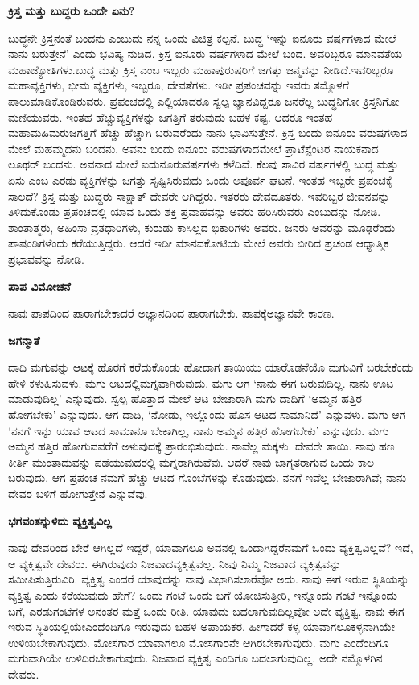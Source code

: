 \centerline{\textbf{ಕ್ರಿಸ್ತ ಮತ್ತು ಬುದ್ಧರು ಒಂದೇ ಏನು?}}

ಬುದ್ಧನೇ ಕ್ರಿಸ್ತನಂತೆ ಬಂದನು ಎಂಬುದು ನನ್ನ ಒಂದು ವಿಚಿತ್ರ ಕಲ್ಪನೆ. ಬುದ್ಧ ‘ಇನ್ನು ಐನೂರು ವರ್ಷಗಳಾದ ಮೇಲೆ ನಾನು ಬರುತ್ತೇನೆ’ ಎಂದು ಭವಿಷ್ಯ ನುಡಿದ. ಕ್ರಿಸ್ತ ಐನೂರು ವರ್ಷಗಳಾದ ಮೇಲೆ ಬಂದ. ಅವರಿಬ್ಬರೂ ಮಾನವತೆಯ ಮಹಾಜ್ಯೋತಿಗಳು.\break ಬುದ್ಧ ಮತ್ತು ಕ್ರಿಸ್ತ ಎಂಬ ಇಬ್ಬರು ಮಹಾಪುರುಷರಿಗೆ ಜಗತ್ತು ಜನ್ಮವನ್ನು ನೀಡಿದೆ.\break ಇವರಿಬ್ಬರೂ ಮಹಾವ್ಯಕ್ತಿಗಳು, ಭೀಮ ವ್ಯಕ್ತಿಗಳು, ಇಬ್ಬರೂ, ದೇವತೆಗಳು. ಇಡೀ ಪ್ರಪಂಚವನ್ನು ಇವರು ತಮ್ಮೊಳಗೆ ಪಾಲುಮಾಡಿಕೊಂಡಿರುವರು. ಪ್ರಪಂಚದಲ್ಲಿ ಎಲ್ಲಿಯಾದರೂ ಸ್ವಲ್ಪ ಜ್ಞಾನವಿದ್ದರೂ ಜನರೆಲ್ಲ ಬುದ್ಧನಿಗೋ ಕ್ರಿಸ್ತನಿಗೋ ಮಣಿಯುವರು. ಇಂತಹ ಹೆಚ್ಚು\break ವ್ಯಕ್ತಿಗಳನ್ನು ಜಗತ್ತಿಗೆ ತರುವುದು ಬಹಳ ಕಷ್ಟ. ಆದರೂ ಇಂತಹ ಮಹಾಮಹಿಮರು\break ಜಗತ್ತಿಗೆ ಹೆಚ್ಚು ಹೆಚ್ಚಾಗಿ ಬರುವರೆಂದು ನಾನು ಭಾವಿಸುತ್ತೇನೆ. ಕ್ರಿಸ್ತ ಬಂದು ಐನೂರು ವರುಷಗಳಾದ ಮೇಲೆ ಮಹಮ್ಮದನು ಬಂದನು. ಅವನು ಬಂದು ಐನೂರು ವರುಷಗಳಾದ\break ಮೇಲೆ ಪ್ರಾಟೆಸ್ಟೆಂಟರ ನಾಯಕನಾದ ಲೂಥರ್​ ಬಂದನು. ಅವನಾದ ಮೇಲೆ ಐದುನೂರು\break ವರ್ಷಗಳು ಕಳೆದಿವೆ. ಕೆಲವು ಸಾವಿರ ವರ್ಷಗಳಲ್ಲಿ ಬುದ್ಧ ಮತ್ತು ಏಸು ಎಂಬ ಎರಡು ವ್ಯಕ್ತಿಗಳನ್ನು ಜಗತ್ತು ಸೃಷ್ಟಿಸಿರುವುದು ಒಂದು ಅಪೂರ್ವ ಘಟನೆ. ಇಂತಹ ಇಬ್ಬರೇ ಪ್ರಪಂಚಕ್ಕೆ ಸಾಲದೆ? ಕ್ರಿಸ್ತ ಮತ್ತು ಬುದ್ಧರು ಸಾಕ್ಷಾತ್​ ದೇವರೇ ಆಗಿದ್ದರು. ಇತರರು ದೇವದೂತರು. ಇವರಿಬ್ಬರ ಜೀವನವನ್ನು ತಿಳಿದುಕೊಂಡು ಪ್ರಪಂಚದಲ್ಲಿ ಯಾವ ಒಂದು ಶಕ್ತಿ ಪ್ರವಾಹವನ್ನು ಅವರು ಹರಿಸಿರುವರು ಎಂಬುದನ್ನು ನೋಡಿ. ಶಾಂತಾತ್ಮರು, ಅಹಿಂಸಾ ವ್ರತಧಾರಿಗಳು, ಕುರುಡು ಕಾಸಿಲ್ಲದ ಭಿಕಾರಿಗಳು ಅವರು. ಜನರು ಅವರನ್ನು ಮೂಢರೆಂದು ಪಾಷಂಡಿಗಳೆಂದು ಕರೆಯುತ್ತಿದ್ದರು. ಆದರೆ ಇಡೀ ಮಾನವಕೋಟಿಯ ಮೇಲೆ ಅವರು ಬೀರಿದ ಪ್ರಚಂಡ ಆಧ್ಯಾತ್ಮಿಕ ಪ್ರಭಾವವನ್ನು ನೋಡಿ.

\centerline{\textbf{ಪಾಪ ವಿಮೋಚನೆ}}

ನಾವು ಪಾಪದಿಂದ ಪಾರಾಗಬೇಕಾದರೆ ಅಜ್ಞಾನದಿಂದ ಪಾರಾಗಬೇಕು. ಪಾಪಕ್ಕೆ\break ಅಜ್ಞಾನವೇ ಕಾರಣ.

\centerline{\textbf{ಜಗನ್ಮಾತೆ}}

ದಾದಿ ಮಗುವನ್ನು ಆಟಕ್ಕೆ ಹೊರಗೆ ಕರೆದುಕೊಂಡು ಹೋದಾಗ ತಾಯಿಯು ಯಾರೊಡನೆಯೊ ಮಗುವಿಗೆ ಬರಬೇಕೆಂದು ಹೇಳಿ ಕಳುಹಿಸುವಳು. ಮಗು ಆಟದಲ್ಲಿ\break ಮಗ್ನವಾಗಿರುವುದು. ಮಗು ಆಗ ‘ನಾನು ಈಗ ಬರುವುದಿಲ್ಲ. ನಾನು ಊಟ ಮಾಡುವುದಿಲ್ಲ’ ಎನ್ನುವುದು. ಸ್ವಲ್ಪ ಹೊತ್ತಾದ ಮೇಲೆ ಆಟ ಬೇಜಾರಾಗಿ ಮಗು ದಾದಿಗೆ ‘ಅಮ್ಮನ ಹತ್ತಿರ ಹೋಗಬೇಕು’ ಎನ್ನುವುದು. ಆಗ ದಾದಿ, ‘ನೋಡು, ಇಲ್ಲೊಂದು ಹೊಸ ಆಟದ ಸಾಮಾನಿದೆ’ ಎನ್ನುವಳು. ಮಗು ಆಗ ‘ನನಗೆ ಇನ್ನು ಯಾವ ಆಟದ ಸಾಮಾನೂ ಬೇಕಾಗಿಲ್ಲ, ನಾನು ಅಮ್ಮನ ಹತ್ತಿರ ಹೋಗಬೇಕು’ ಎನ್ನುವುದು. ಮಗು ಅಮ್ಮನ ಹತ್ತಿರ ಹೋಗುವವರೆಗೆ ಅಳುವುದಕ್ಕೆ ಪ್ರಾರಂಭಿಸುವುದು. ನಾವೆಲ್ಲ ಮಕ್ಕಳು. ದೇವರೇ ತಾಯಿ. ನಾವು ಹಣ ಕೀರ್ತಿ ಮುಂತಾದುವನ್ನು ಪಡೆಯುವುದರಲ್ಲಿ ಮಗ್ನರಾಗಿರುವೆವು. ಆದರೆ ನಾವು ಜಾಗೃತರಾಗುವ ಒಂದು ಕಾಲ ಬರುವುದು. ಆಗ ಪ್ರಪಂಚ ನಮಗೆ ಹೆಚ್ಚು ಆಟದ ಗೊಂಬೆಗಳನ್ನು ಕೊಡುವುದು. ನನಗೆ ಇವೆಲ್ಲ ಬೇಜಾರಾಗಿವೆ; ನಾನು ದೇವರ ಬಳಿಗೆ ಹೋಗುತ್ತೇನೆ ಎನ್ನುವೆವು.

\centerline{\textbf{ಭಗವಂತನ್ನುಳಿದು ವ್ಯಕ್ತಿತ್ವವಿಲ್ಲ}}

ನಾವು ದೇವರಿಂದ ಬೇರೆ ಆಗಿಲ್ಲದೆ ಇದ್ದರೆ, ಯಾವಾಗಲೂ ಅವನಲ್ಲಿ ಒಂದಾಗಿದ್ದರೆ\break ನಮಗೆ ಒಂದು ವ್ಯಕ್ತಿತ್ವವಿಲ್ಲವೆ? ಇದೆ, ಆ ವ್ಯಕ್ತಿತ್ವವೇ ದೇವರು. ಈಗಿರುವುದು ನಿಜವಾದ\break ವ್ಯಕ್ತಿತ್ವವಲ್ಲ. ನೀವು ನಿಮ್ಮ ನಿಜವಾದ ವ್ಯಕ್ತಿತ್ವವನ್ನು ಸಮೀಪಿಸುತ್ತಿರುವಿರಿ. ವ್ಯಕ್ತಿತ್ವ ಎಂದರೆ ಯಾವುದನ್ನು ನಾವು ವಿಭಾಗಿಸಲಾರೆವೋ ಅದು. ನಾವು ಈಗ ಇರುವ ಸ್ಥಿತಿಯನ್ನು ವ್ಯಕ್ತಿತ್ವ ಎಂದು ಕರೆಯುವುದು ಹೇಗೆ? ಒಂದು ಗಂಟೆ ಒಂದು ಬಗೆ ಯೋಚಿಸುತ್ತೀರಿ, ಇನ್ನೊಂದು ಗಂಟೆ ಇನ್ನೊಂದು ಬಗೆ, ಎರಡುಗಂಟೆಗಳ ಅನಂತರ ಮತ್ತೆ ಒಂದು ರೀತಿ. ಯಾವುದು ಬದಲಾಗುವುದಿಲ್ಲವೋ ಅದೇ ವ್ಯಕ್ತಿತ್ವ. ನಾವು ಈಗ ಇರುವ ಸ್ಥಿತಿಯಲ್ಲಿಯೇ\break ಎಂದೆಂದಿಗೂ ಇರುವುದು ಬಹಳ ಅಪಾಯಕರ. ಹೀಗಾದರೆ ಕಳ್ಳ ಯಾವಾಗಲೂ\break ಕಳ್ಳನಾಗಿಯೇ ಉಳಿಯಬೇಕಾಗುವುದು. ಮೋಸಗಾರ ಯಾವಾಗಲೂ ಮೋಸಗಾರನೇ ಆಗಿರಬೇಕಾಗುವುದು. ಮಗು ಎಂದೆಂದಿಗೂ ಮಗುವಾಗಿಯೇ ಉಳಿದಿರಬೇಕಾಗುವುದು. ನಿಜವಾದ ವ್ಯಕ್ತಿತ್ವ ಎಂದಿಗೂ ಬದಲಾಗುವುದಿಲ್ಲ. ಅದೇ ನಮ್ಮೊಳಗಿನ ದೇವರು.

